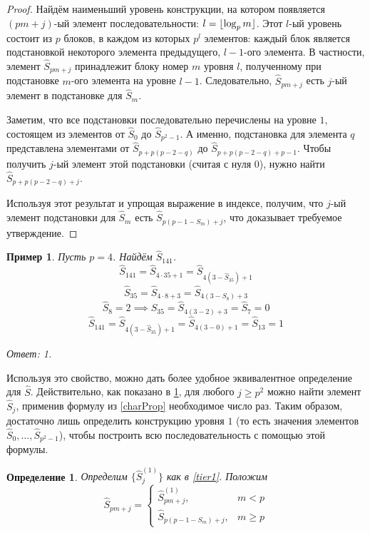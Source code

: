\documentclass[14pt, a4paper, russian]{report}
\DeclarePairedDelimiter\floor{\lfloor}{\rfloor}
\newtheorem{definition}{\indent Определение}
\newtheorem{example}{\indent Пример}
\begin{document}
\begin{proof}
Найдём наименьший уровень конструкции, на котором появляется $(pm+j)$-ый элемент последовательности: 
$l = \floor{\log_p{m}}$. Этот $l$-ый уровень состоит из $p$ блоков, в каждом из которых $p^l$ 
элементов: каждый блок является подстановкой некоторого элемента предыдущего, $l-1$-ого элемента. В частности, элемент $\hat{S}_{pm+j}$ принадлежит блоку номер $m$ уровня $l$, полученному при подстановке $m$-ого элемента на уровне $l-1$. Следовательно,  
$\hat{S}_{pm+j}$ есть $j$-ый элемент в подстановке для $\hat{S}_m$.

Заметим, что все подстановки последовательно перечислены на уровне $1$, состоящем из элементов от $\hat{S}_0$ до $\hat{S}_{p^2-1}$. А именно, подстановка для элемента $q$ представлена элементами от $\hat{S}_{p + p(p-2-q)}$ до $\hat{S}_{p + p(p-2-q) + p-1}$. Чтобы получить $j$-ый элемент этой подстановки (считая с нуля 0), нужно найти $\hat{S}_{p + p(p-2-q) + j}$. 

Используя этот результат и упрощая выражение в индексе, получим, что $j$-ый элемент подстановки для $\hat{S}_m$ есть $\hat{S}_{p(p-1-S_m) + j}$, что доказывает требуемое утверждение.
\end{proof}
\begin{example}\label{Sj_evaluation}
Пусть $p=4$. Найдём $\hat{S}_{141}$.
$$ \hat{S}_{141} = \hat{S}_{4 \cdot 35 + 1} = \hat{S}_{4(3-\hat{S}_{35}) +1}$$
$$ \hat{S}_{35} = \hat{S}_{4 \cdot 8 + 3} = \hat{S}_{4(3-S_{8}) +3}$$
$$\hat{S}_8 = 2 \implies \hat{S}_{35}=\hat{S}_{4(3-2)+3}=\hat{S}_7=0$$
$$\hat{S}_{141}=\hat{S}_{4(3-\hat{S}_{35}) +1} = \hat{S}_{4(3-0)+1} = \hat{S}_{13}=1$$

\emph{Ответ:} 1.

\end{example}

Используя это свойство, можно дать более удобное эквивалентное определение для $\hat{S}$. Действительно, как показано в \cref{Sj_evaluation}, для любого $j \ge p^2$ можно найти элемент $\hat{S}_j$, применив формулу из \cref{charProp} необходимое число раз. Таким образом, достаточно лишь определить конструкцию уровня $1$ (то есть значения элементов $\hat{S}_0, \ldots, \hat{S}_{p^2-1}$), чтобы построить всю последовательность с помощью этой формулы.
\begin{definition}\label{sm_good_def}
Определим $\{\hat{S}_j^{(1)}\}$ как в \cref{tier1}. Положим
$$ \hat{S}_{pm+j} =
 \begin{cases}
     \hat{S}_{pm+j}^{(1)}, & m < p \\
     \hat{S}_{p(p-1-S_m) + j}, & m \ge p
 \end{cases}
$$
\end{definition}
\end{document}
